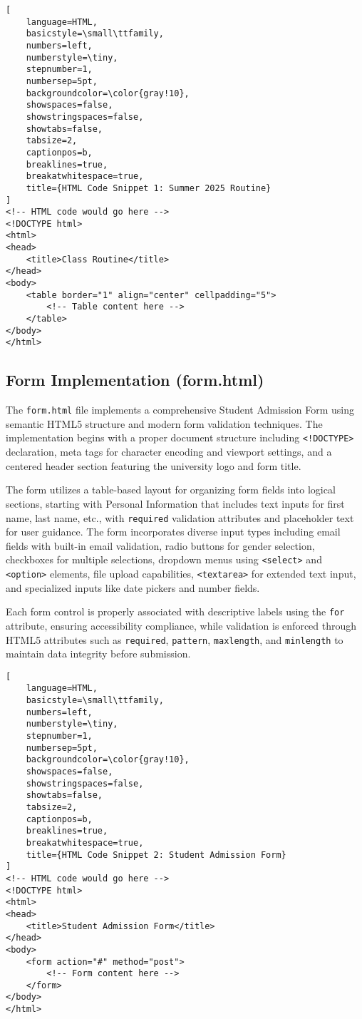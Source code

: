 \documentclass[twoside]{article}
\begin{document}
\begin{lstlisting}[
    language=HTML,
    basicstyle=\small\ttfamily,
    numbers=left,
    numberstyle=\tiny,
    stepnumber=1,
    numbersep=5pt,
    backgroundcolor=\color{gray!10},
    showspaces=false,
    showstringspaces=false,
    showtabs=false,
    tabsize=2,
    captionpos=b,
    breaklines=true,
    breakatwhitespace=true,
    title={HTML Code Snippet 1: Summer 2025 Routine}
]
<!-- HTML code would go here -->
<!DOCTYPE html>
<html>
<head>
    <title>Class Routine</title>
</head>
<body>
    <table border="1" align="center" cellpadding="5">
        <!-- Table content here -->
    </table>
</body>
</html>
\end{lstlisting}


\subsection{Form Implementation (form.html)}
The \texttt{form.html} file implements a comprehensive Student Admission Form using semantic HTML5 structure and modern form validation techniques. The implementation begins with a proper document structure including \texttt{<!DOCTYPE>} declaration, meta tags for character encoding and viewport settings, and a centered header section featuring the university logo and form title.

The form utilizes a table-based layout for organizing form fields into logical sections, starting with Personal Information that includes text inputs for first name, last name, etc., with \texttt{required} validation attributes and placeholder text for user guidance. The form incorporates diverse input types including email fields with built-in email validation, radio buttons for gender selection, checkboxes for multiple selections, dropdown menus using \texttt{<select>} and \texttt{<option>} elements, file upload capabilities, \texttt{<textarea>} for extended text input, and specialized inputs like date pickers and number fields.

Each form control is properly associated with descriptive labels using the \texttt{for} attribute, ensuring accessibility compliance, while validation is enforced through HTML5 attributes such as \texttt{required}, \texttt{pattern}, \texttt{maxlength}, and \texttt{minlength} to maintain data integrity before submission.

\begin{lstlisting}[
    language=HTML,
    basicstyle=\small\ttfamily,
    numbers=left,
    numberstyle=\tiny,
    stepnumber=1,
    numbersep=5pt,
    backgroundcolor=\color{gray!10},
    showspaces=false,
    showstringspaces=false,
    showtabs=false,
    tabsize=2,
    captionpos=b,
    breaklines=true,
    breakatwhitespace=true,
    title={HTML Code Snippet 2: Student Admission Form}
]
<!-- HTML code would go here -->
<!DOCTYPE html>
<html>
<head>
    <title>Student Admission Form</title>
</head>
<body>
    <form action="#" method="post">
        <!-- Form content here -->
    </form>
</body>
</html>
\end{lstlisting}
\end{document}
